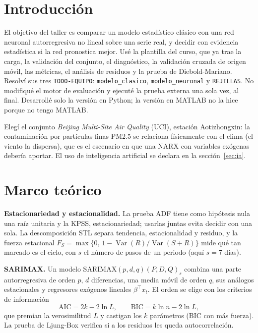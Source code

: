\documentclass[11pt,letterpaper]{article}
\begin{document}
\UDportada

\section{Introducción}

El objetivo del taller es comparar un modelo estadístico clásico con una red neuronal autorregresiva no lineal sobre una serie real, y decidir con evidencia estadística si la red pronostica mejor. Usé la plantilla del curso, que ya trae la carga, la validación del conjunto, el diagnóstico, la validación cruzada de origen móvil, las métricas, el análisis de residuos y la prueba de Diebold-Mariano. Resolví sus tres \texttt{TODO-EQUIPO}: \texttt{modelo\_clasico}, \texttt{modelo\_neuronal} y \texttt{REJILLAS}. No modifiqué el motor de evaluación y ejecuté la prueba externa una sola vez, al final. Desarrollé solo la versión en Python; la versión en MATLAB no la hice porque no tengo MATLAB.

Elegí el conjunto \textit{Beijing Multi-Site Air Quality} (UCI), estación Aotizhongxin: la contaminación por partículas finas PM2.5 se relaciona físicamente con el clima (el viento la dispersa), que es el escenario en que una NARX con variables exógenas debería aportar. El uso de inteligencia artificial se declara en la sección~\ref{sec:ia}.

\section{Marco teórico}

\textbf{Estacionariedad y estacionalidad.} La prueba ADF tiene como hipótesis nula una raíz unitaria y la KPSS, estacionariedad; usarlas juntas evita decidir con una sola. La descomposición STL separa tendencia, estacionalidad y residuo, y la fuerza estacional $F_S = \max\{0,\, 1-\operatorname{Var}(R)/\operatorname{Var}(S+R)\}$ mide qué tan marcado es el ciclo, con $s$ el número de pasos de un periodo (aquí $s=7$ días).

\textbf{SARIMAX.} Un modelo $\mathrm{SARIMAX}(p,d,q)(P,D,Q)_s$ combina una parte autorregresiva de orden $p$, $d$ diferencias, una media móvil de orden $q$, sus análogos estacionales y regresores exógenos lineales $\beta^\top x_t$. El orden se elige con los criterios de información
\begin{equation*}
\mathrm{AIC} = 2k - 2\ln L, \qquad \mathrm{BIC} = k\ln n - 2\ln L,
\end{equation*}
que premian la verosimilitud $L$ y castigan los $k$ parámetros (BIC con más fuerza). La prueba de Ljung-Box verifica si a los residuos les queda autocorrelación.
\end{document}
